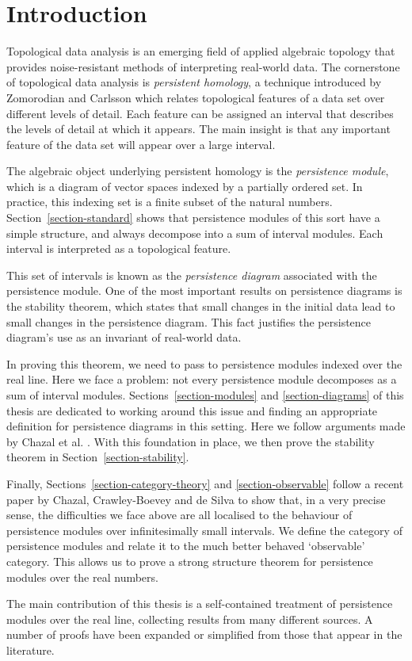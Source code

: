 \section{Introduction}

Topological data analysis is an emerging field of applied algebraic topology that provides noise-resistant methods of interpreting real-world data. The cornerstone of topological data analysis is \emph{persistent homology}, a technique introduced by Zomorodian and Carlsson \cite{zomorodian2005computing} which relates topological features of a data set over different levels of detail. Each feature can be assigned an interval that describes the levels of detail at which it appears. The main insight is that any important feature of the data set will appear over a large interval. 

The algebraic object underlying persistent homology is the \emph{persistence module}, which is a diagram of vector spaces indexed by a partially ordered set. In practice, this indexing set is a finite subset of the natural numbers. Section~\ref{section-standard} shows that persistence modules of this sort have a simple structure, and always decompose into a sum of interval modules. Each interval is interpreted as a topological feature. 

This set of intervals is known as the \emph{persistence diagram} associated with the persistence module. One of the most important results on persistence diagrams is the stability theorem, which states that small changes in the initial data lead to small changes in the persistence diagram. This fact justifies the persistence diagram's use as an invariant of real-world data.

In proving this theorem, we need to pass to persistence modules indexed over the real line. Here we face a problem: not every persistence module decomposes as a sum of interval modules. Sections~\ref{section-modules} and \ref{section-diagrams} of this thesis are dedicated to working around this issue and finding an appropriate definition for persistence diagrams in this setting. Here we follow arguments made by Chazal et al. \cite{chazal2012structure}. With this foundation in place, we then prove the stability theorem in Section~\ref{section-stability}.

Finally, Sections~\ref{section-category-theory} and \ref{section-observable} follow a recent paper by Chazal, Crawley-Boevey and de Silva \cite{chazal2014observable} to show that, in a very precise sense, the difficulties we face above are all localised to the behaviour of persistence modules over infinitesimally small intervals. We define the category of persistence modules and relate it to the much better behaved `observable' category. This allows us to prove a strong structure theorem for persistence modules over the real numbers.

The main contribution of this thesis is a self-contained treatment of persistence modules over the real line, collecting results from many different sources. A number of proofs have been expanded or simplified from those that appear in the literature.
